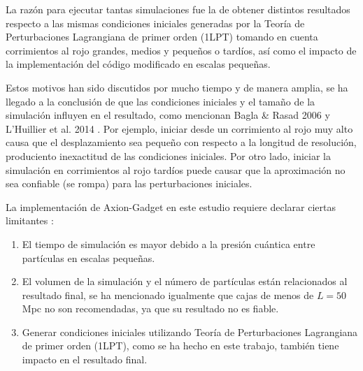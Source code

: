 \documentclass[a4paper,openright,12pt]{book}
\begin{document}
\begin{table}[]
\begin{tabular}{lccccl}
\end{tabular}
\end{table}

La razón para ejecutar tantas simulaciones fue la de obtener distintos resultados respecto a las mismas condiciones iniciales generadas por la Teoría de Perturbaciones Lagrangiana de primer orden (1LPT) tomando en cuenta corrimientos al rojo grandes, medios y pequeños o tardíos, así como el impacto de la implementación del código modificado en escalas pequeñas.

Estos motivos han sido discutidos por mucho tiempo y de manera amplia, se ha llegado a la conclusión de que las condiciones iniciales y el tamaño de la simulación influyen en el resultado, como mencionan Bagla \& Rasad 2006 \cite{4.3.3} y L'Huillier et al. 2014 \cite{4.3.4}. Por ejemplo, iniciar desde un corrimiento al rojo muy alto causa que el desplazamiento sea pequeño con respecto a la longitud de resolución, produciento inexactitud de las condiciones iniciales. Por otro lado, iniciar la simulación en corrimientos al rojo tardíos puede causar que la aproximación no sea confiable (se rompa) para las perturbaciones iniciales.

La implementación de Axion-Gadget en este estudio requiere declarar ciertas limitantes \cite{4.3.5}:
\begin{enumerate}
\item El tiempo de simulación es mayor debido a la presión cuántica entre partículas en escalas pequeñas.
\item El volumen de la simulación y el número de partículas están relacionados al resultado final, se ha mencionado igualmente que cajas de menos de $L = 50$ Mpc no son recomendadas, ya que su resultado no es fiable.
\item Generar condiciones iniciales utilizando Teoría de Perturbaciones Lagrangiana de primer orden (1LPT), como se ha hecho en este trabajo, también tiene impacto en el resultado final.
\end{enumerate}
\end{document}
